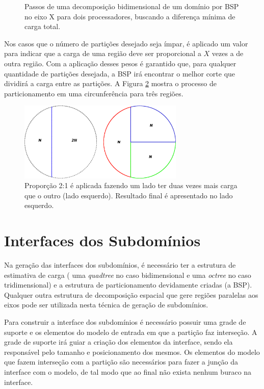 \begin{figure}[ht]
{	}
	\caption{Passos de uma decomposição bidimensional de um domínio por BSP no eixo X para dois processadores, buscando a diferença mínima de carga total.}
	\label{fig:passos_decomposicao_BSP}
\end{figure}


Nos casos que o número de partições desejado seja ímpar, é aplicado um valor para indicar que a carga de uma região deve ser proporcional a $X$ vezes a de outra região. Com a aplicação desses pesos é garantido que, para qualquer quantidade de partições desejada, a BSP irá encontrar o melhor corte que dividirá a carga entre as partições. A Figura \ref{fig:circunferencia_cortejunto} mostra o processo de particionamento em uma circunferência para três regiões.

\begin{figure}[!ht]
	\centering
	\includegraphics[width=0.7\textwidth]{fig/circunferencia_cortejunto.png}
	\caption{Proporção 2:1 é aplicada fazendo um lado ter duas vezes mais carga que o outro (lado esquerdo). Resultado final é apresentado no lado esquerdo.}
	\label{fig:circunferencia_cortejunto}
\end{figure}

\section{Interfaces dos Subdomínios}

Na geração das interfaces dos subdomínios, é necessário ter a estrutura de estimativa de carga ( uma \textit{quadtree} no caso bidimensional e uma \textit{octree} no caso tridimensional) e a estrutura de particionamento devidamente criadas (a BSP). Qualquer outra estrutura de decomposição espacial que gere regiões paralelas aos eixos pode ser utilizada nesta técnica de geração de subdomínios. 

Para construir a interface dos subdomínios é necessário possuir uma grade de suporte e os elementos do modelo de entrada em que a partição faz interseção. A grade de suporte irá guiar a criação dos elementos da interface, sendo ela responsável pelo tamanho e posicionamento dos mesmos. Os elementos do modelo que fazem interseção com a partição são necessários para fazer a junção da interface com o modelo, de tal modo que ao final não exista nenhum buraco na interface.

